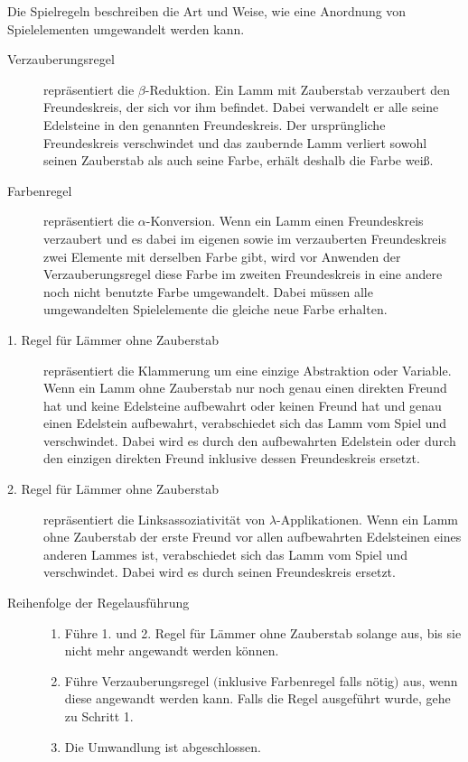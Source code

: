 Die Spielregeln beschreiben die Art und Weise, wie eine Anordnung von Spielelementen umgewandelt werden kann. 

\begin{description}
\item[Verzauberungsregel] repräsentiert die $\beta$-Reduktion. Ein Lamm mit Zauberstab verzaubert den Freundeskreis, der sich vor ihm befindet. Dabei verwandelt er alle seine Edelsteine in den genannten Freundeskreis. Der ursprüngliche Freundeskreis verschwindet und das zaubernde Lamm verliert sowohl seinen Zauberstab als auch seine Farbe, erhält deshalb die Farbe weiß.
\item[Farbenregel] repräsentiert die $\alpha$-Konversion. Wenn ein Lamm einen Freundeskreis verzaubert und es dabei im eigenen sowie im verzauberten Freundeskreis zwei Elemente mit derselben Farbe gibt, wird vor Anwenden der Verzauberungsregel diese Farbe im zweiten Freundeskreis in eine andere noch nicht benutzte Farbe umgewandelt. Dabei müssen alle umgewandelten Spielelemente die gleiche neue Farbe erhalten.
\item[1. Regel für Lämmer ohne Zauberstab] repräsentiert die Klammerung um eine einzige Abstraktion oder Variable. Wenn ein Lamm ohne Zauberstab nur noch genau einen direkten Freund hat und keine Edelsteine aufbewahrt oder keinen Freund hat und genau einen Edelstein aufbewahrt, verabschiedet sich das Lamm vom Spiel und verschwindet. Dabei wird es durch den aufbewahrten Edelstein oder durch den einzigen direkten Freund inklusive dessen Freundeskreis ersetzt.
\item[2. Regel für Lämmer ohne Zauberstab] repräsentiert die Linksassoziativität von $\lambda$-Applikationen. Wenn ein Lamm ohne Zauberstab der erste Freund vor allen aufbewahrten Edelsteinen eines anderen Lammes ist, verabschiedet sich das Lamm vom Spiel und verschwindet. Dabei wird es durch seinen Freundeskreis ersetzt.
\item[Reihenfolge der Regelausführung] \hfill
\begin{enumerate}
\item Führe 1. und 2. Regel für Lämmer ohne Zauberstab solange aus, bis sie nicht mehr angewandt werden können.
\item Führe Verzauberungsregel $($inklusive Farbenregel falls nötig$)$ aus, wenn diese angewandt werden kann. Falls die Regel ausgeführt wurde, gehe zu Schritt 1.
\item Die Umwandlung ist abgeschlossen.
\end{enumerate}
\end{description}

